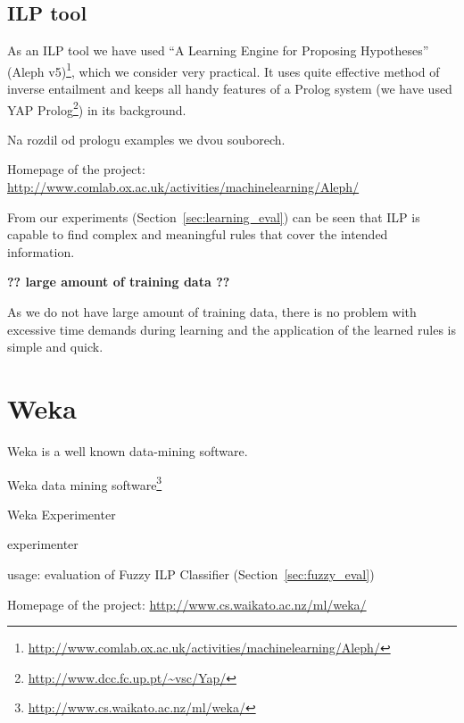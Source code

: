 \subsection{ILP tool} \label{sec:third_ILP_tool}
As an ILP tool we have used ``A Learning Engine for Proposing Hypotheses'' (Aleph v5)\footnote{\url{http://www.comlab.ox.ac.uk/activities/machinelearning/Aleph/}}, which we consider very practical. It uses quite effective method of inverse entailment \citep{biblio:InverseEntailment} and keeps all handy features of a Prolog system (we have used YAP Prolog\footnote{\url{http://www.dcc.fc.up.pt/~vsc/Yap/}}) in its background.


Na rozdil od prologu examples we dvou souborech.

\medskip
Homepage of the project: \url{http://www.comlab.ox.ac.uk/activities/machinelearning/Aleph/}



From our experiments (Section~\ref{sec:learning_eval}) can be seen that ILP is capable to find complex and meaningful rules that cover the intended information.



\textbf{?? large amount of training data ??}

As we do not have large amount of training data, there is no problem with excessive time demands during learning and the application of the learned rules is simple and quick.



\section{Weka} \label{sec:third_weka}

Weka \citep{biblio:Weka} is a well known data-mining software.

Weka data mining software\footnote{\url{http://www.cs.waikato.ac.nz/ml/weka/}} \citep{biblio:Weka}

Weka Experimenter 

experimenter

usage: evaluation of Fuzzy ILP Classifier (Section~\ref{sec:fuzzy_eval})

\medskip
Homepage of the project: \url{http://www.cs.waikato.ac.nz/ml/weka/}

